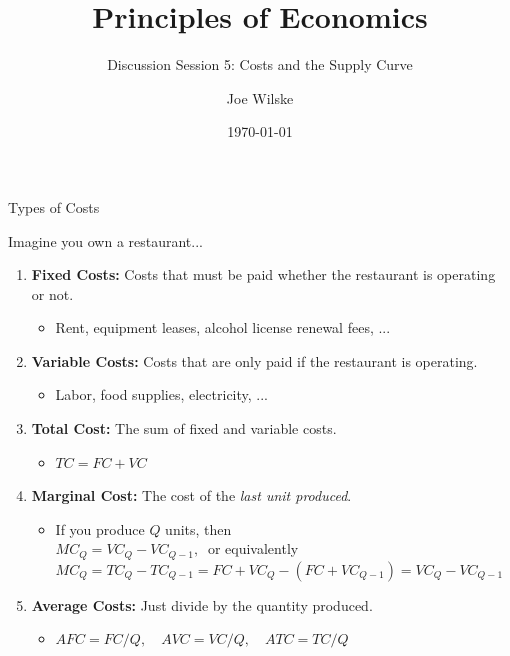 \documentclass[9pt]{beamer}
\title{Principles of Economics}
\subtitle{Discussion Session 5: Costs and the Supply Curve}
\author{Joe Wilske}
\institute{Boston College}
\date{\today}
\begin{document}
\frame{\titlepage}

\begin{frame}{Types of Costs}

Imagine you own a restaurant...
\vspace{5pt}
    \begin{enumerate}
        \item \textbf{Fixed Costs:} Costs that must be paid whether the restaurant is operating or not.
        \begin{itemize}
            \item Rent, equipment leases, alcohol license renewal fees, ...
        \end{itemize}
        \vspace{5pt}
        \item \textbf{Variable Costs:} Costs that are only paid if the restaurant is operating.
        \begin{itemize}
            \item Labor, food supplies, electricity, ...
        \end{itemize}
        \vspace{5pt}
        \item \textbf{Total Cost:} The sum of fixed and variable costs. 
        \begin{itemize}
            \item $TC = FC + VC$    
        \end{itemize}
        \vspace{5pt}
        \item \textbf{Marginal Cost:}  The cost of the \textit{last unit produced}.
        \begin{itemize}
            \item If you produce $Q$ units, then\\
            \vspace{2pt}
            $MC_Q = VC_Q - VC_{Q-1}, \:$ or equivalently\\
            \vspace{2pt}
            $MC_Q = TC_Q - TC_{Q-1} = FC + VC_Q - (FC + VC_{Q-1}) = VC_Q - VC_{Q-1}$
        \end{itemize}
        \vspace{5pt}
        \item \textbf{Average Costs:} Just divide by the quantity produced.
        \begin{itemize}
            \item $AFC = FC/Q, \quad AVC = VC/Q, \quad ATC = TC/Q$
        \end{itemize}
    \end{enumerate}
\end{frame}
\end{document}
